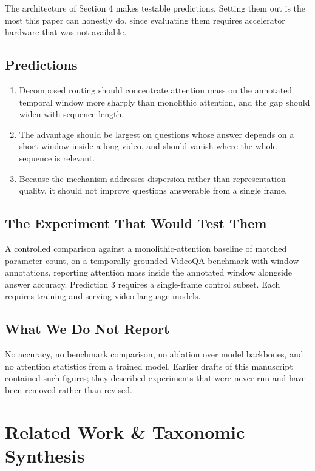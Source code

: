 \documentclass{article}
\begin{document}
The architecture of Section 4 makes testable predictions. Setting them out is the most this paper can honestly do, since evaluating them requires accelerator hardware that was not available.


\subsection{Predictions}


\begin{enumerate}
  \item Decomposed routing should concentrate attention mass on the annotated temporal window more sharply than monolithic attention, and the gap should widen with sequence length.
  \item The advantage should be largest on questions whose answer depends on a short window inside a long video, and should vanish where the whole sequence is relevant.
  \item Because the mechanism addresses dispersion rather than representation quality, it should not improve questions answerable from a single frame.
\end{enumerate}


\subsection{The Experiment That Would Test Them}


A controlled comparison against a monolithic-attention baseline of matched parameter count, on a temporally grounded VideoQA benchmark with window annotations, reporting attention mass inside the annotated window alongside answer accuracy. Prediction 3 requires a single-frame control subset. Each requires training and serving video-language models.


\subsection{What We Do Not Report}


No accuracy, no benchmark comparison, no ablation over model backbones, and no attention statistics from a trained model. Earlier drafts of this manuscript contained such figures; they described experiments that were never run and have been removed rather than revised.




\section{Related Work \& Taxonomic Synthesis}
\end{document}
